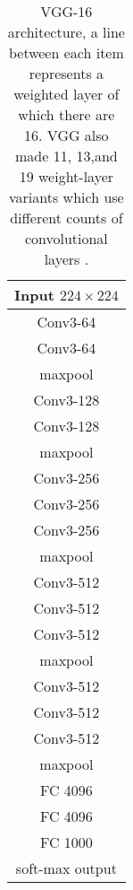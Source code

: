 \begin{table}
    \begin{center}
        \begin{tabular}{| c |}
        \hline
        Input $224 \times 224$ \\
        \hline
        Conv3-64 \\
        Conv3-64 \\
        \hline
        maxpool\\
        \hline
        Conv3-128 \\
        Conv3-128 \\
        \hline
        maxpool \\
        \hline
        Conv3-256 \\
        Conv3-256 \\
        Conv3-256 \\
        \hline
        maxpool \\
        \hline
        Conv3-512 \\
        Conv3-512 \\
        Conv3-512 \\
        \hline
        maxpool \\
        \hline
        Conv3-512 \\
        Conv3-512 \\
        Conv3-512 \\
        \hline
        maxpool\\
        \hline
        FC 4096\\
        \hline
        FC 4096\\
        \hline
        FC 1000\\
        \hline
        soft-max output\\
        \hline
        \end{tabular}
        \caption{VGG-16 architecture, a line between each item represents a weighted layer of which there are 16. VGG also made 11, 13,and 19 weight-layer variants which use different counts of convolutional layers \cite{vgg16-arxiv}.}
    \end{center}
\end{table}


